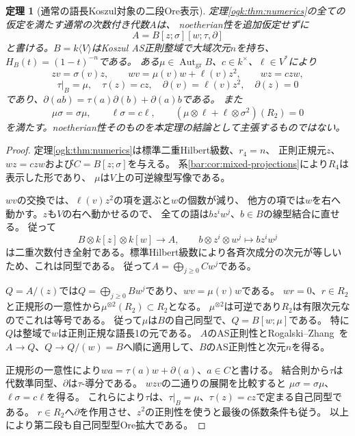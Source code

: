 \documentclass[11pt,a4paper]{ltjsarticle}
\newtheorem{theorem}{定理}[section]
\theoremstyle{definition}
\begin{document}
\begin{theorem}[通常の語長Koszul対象の二段Ore表示]
\label{ogk:thm:ore-without-noetherian}
定理\ref{ogk:thm:numerics}の全ての仮定を満たす通常の次数付き代数$A$は、
noetherian性を追加仮定せずに
\[
A=B[z;\sigma][w;\tau,\partial]
\]
と書ける。$B=k\langle V\rangle$はKoszul AS正則整域で大域次元$n$を持ち、
$H_B(t)=(1-t)^{-n}$である。
ある$\mu\in\operatorname{Aut}_{\mathrm{gr}}B$、$c\in k^\times$、$\ell\in V^*$により
\[
zv=\sigma(v)z,\qquad
wv=\mu(v)w+\ell(v)z^2,\qquad
wz=c zw,
\]
\[
\tau|_B=\mu,\quad\tau(z)=cz,\quad
\partial(v)=\ell(v)z^2,\quad\partial(z)=0
\]
であり、\(\partial(ab)=\tau(a)\partial(b)+\partial(a)b\)である。
また
\[
\mu\sigma=\sigma\mu,\qquad \ell\sigma=c\ell,\qquad
(\mu\otimes\ell+\ell\otimes\sigma^2)(R_2)=0
\]
を満たす。noetherian性そのものを本定理の結論として主張するものではない。
\end{theorem}
\begin{proof}
定理\ref{ogk:thm:numerics}は標準二重Hilbert級数、$r_4=n$、
正則正規元$z$、$wz=c zw$および$C=B[z;\sigma]$を与える。
系\ref{bar:cor:mixed-projections}により$R_4$は表示した形であり、
$\mu$は$V$上の可逆線型写像である。

$wv$の交換では、$\ell(v)z^2$の項を選ぶと$w$の個数が減り、
他方の項では$w$を右へ動かす。$z$も$V$の右へ動かせるので、
全ての語は$b z^i w^j$、$b\in B$の線型結合に直せる。
従って
\[
B\otimes k[z]\otimes k[w]\longrightarrow A,
\qquad b\otimes z^i\otimes w^j\longmapsto bz^iw^j
\]
は二重次数付き全射である。標準Hilbert級数により各斉次成分の次元が等しいため、これは同型である。
従って$A=\bigoplus_{j\ge0}Cw^j$である。

$Q=A/(z)$では$Q=\bigoplus_{j\ge0}Bw^j$であり、$wv=\mu(v)w$である。
$wr=0$、$r\in R_2$と正規形の一意性から$\mu^{\otimes2}(R_2)\subset R_2$となる。
$\mu^{\otimes2}$は可逆であり$R_2$は有限次元なのでこれは等号である。
従って$\mu$は$B$の自己同型で、$Q=B[w;\mu]$である。
特に$Q$は整域で$w$は正則正規な語長1の元である。
$A$のAS正則性とRogalski--Zhang~\cite[Corollary~1.2]{RZ}を
$A\to Q$、$Q\to Q/(w)=B$へ順に適用して、$B$のAS正則性と次元$n$を得る。

正規形の一意性により$wa=\tau(a)w+\partial(a)$、$a\in C$と書ける。
結合則から$\tau$は代数準同型、$\partial$は$\tau$-導分である。
$wzv$の二通りの展開を比較すると
$\mu\sigma=\sigma\mu$、$\ell\sigma=c\ell$を得る。
これらにより$\tau$は、$\tau|_B=\mu$、$\tau(z)=cz$で定まる自己同型である。
$r\in R_2$へ$\partial$を作用させ、$z^2$の正則性を使うと最後の係数条件も従う。
以上により第二段も自己同型型Ore拡大である。
\end{proof}
\end{document}
